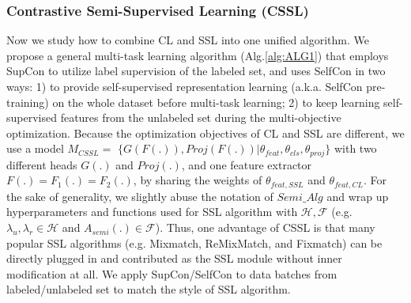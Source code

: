 \documentclass[letterpaper]{article} \usepackage{aaai22}  \usepackage{times}  \usepackage{helvet}  \usepackage{courier}  \usepackage[hyphens]{url}  \usepackage{graphicx} \usepackage{subfigure}
\begin{document}
\subsubsection{Contrastive Semi-Supervised Learning (CSSL)}
Now we study how to combine CL and SSL into one unified algorithm. We propose a general multi-task learning algorithm (Alg.\ref{alg:ALG1}) that employs SupCon to utilize label supervision of the labeled set, and uses SelfCon in two ways: 1) to provide self-supervised representation learning (a.k.a. SelfCon pre-training) on the whole dataset before multi-task learning; 2) to keep learning self-supervised features from the unlabeled set during the multi-objective optimization. Because the optimization objectives of CL and SSL are different, we use a model $M_{CSSL}=$ $\{G(F(.)), Proj(F(.))|\theta_{feat}, \theta_{cls}, \theta_{proj}\}$ with two different heads $G(.)$ and $Proj(.)$, and one feature extractor $F(.)=F_1(.)=F_2(.)$, by sharing the weights of $\theta_{feat,SSL}$ and $\theta_{feat,CL}$. For the sake of generality, we slightly abuse the notation of $Semi\_Alg$ and wrap up hyperparameters and functions used for SSL algorithm with $\mathcal{H}, \mathcal{F}$ (e.g. $\lambda_{u}, \lambda_{r} \in \mathcal{H}$ and $A_{semi}(.) \in \mathcal{F}$). Thus, one advantage of CSSL is that many popular SSL algorithms (e.g. Mixmatch, ReMixMatch, and Fixmatch) can be directly plugged in and contributed as the SSL module without inner modification at all. We apply SupCon/SelfCon to data batches from labeled/unlabeled set to match the style of SSL algorithm.
\end{document}
